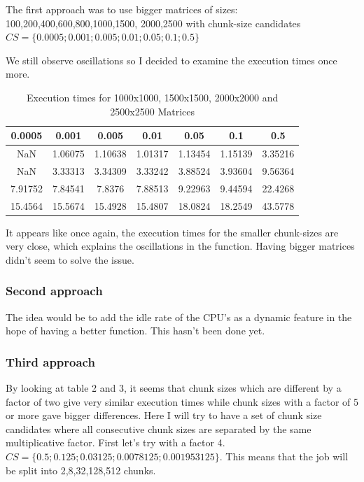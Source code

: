 \documentclass[12pt]{article}
\begin{document}
The first approach was to use bigger matrices of sizes:
100,200,400,600,800,1000,1500,
2000,2500 with chunk-size candidates $CS=\{0.0005;0.001; 0.005; 0.01; 0.05; 0.1;0.5\}$


We still observe oscillations so I decided to examine the execution times once more.

\begin{table}[h]
	\centering
	\caption{Execution times for 1000x1000, 1500x1500, 2000x2000 and 2500x2500 Matrices}
	\label{my-label}
	\begin{tabular}{|c|c|c|c|c|c|c|}
		\hline
		0.0005  & 0.001   & 0.005   & 0.01    & 0.05    & 0.1     & 0.5     \\ \hline
		NaN     & 1.06075 & 1.10638 & 1.01317 & 1.13454 & 1.15139 & 3.35216 \\ \hline
		NaN     & 3.33313 & 3.34309 & 3.33242 & 3.88524 & 3.93604 & 9.56364 \\ \hline
		7.91752 & 7.84541 & 7.8376  & 7.88513 & 9.22963 & 9.44594 & 22.4268 \\ \hline
		15.4564 & 15.5674 & 15.4928 & 15.4807 & 18.0824 & 18.2549 & 43.5778 \\ \hline
	\end{tabular}
\end{table}

It appears like once again, the execution times for the smaller chunk-sizes are very close, which explains the oscillations in the function. Having bigger matrices didn't seem to solve the issue.

\subsubsection{Second approach}

The idea would be to add the idle rate of the CPU's as a dynamic feature in the hope of having a better function.
This hasn't been done yet.

\subsubsection{Third approach}
By looking at table 2 and 3, it seems that chunk sizes which are different by a factor of two give very similar execution times while chunk sizes with a factor of 5 or more gave bigger differences. Here I will try to have a set of chunk size candidates where all consecutive chunk sizes are separated by the same multiplicative factor. First let's try with a factor 4. $CS=\{0.5;0.125;0.03125;0.0078125;0.001953125\}$. This means that the job will be split into 2,8,32,128,512 chunks.
\end{document}
